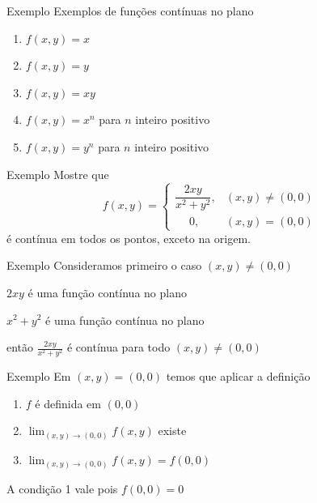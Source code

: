 \addtocounter{exemplo}{1}
\begin{frame}{Exemplo \theexemplo}
  Exemplos de funções contínuas no plano
  \begin{enumerate}[<+->]
    \item \(f(x, y) = x\)
    \item \(f(x, y) = y\)
    \item \(f(x, y) = xy\)
    \item \(f(x, y) = x^n\) para $n$ inteiro positivo
    \item \(f(x, y) = y^n\) para $n$ inteiro positivo
  \end{enumerate}
\end{frame}

\addtocounter{exemplo}{1}
\begin{frame}{Exemplo \theexemplo}
  Mostre que
  \[
    f(x, y) =
    \begin{cases}
      \dfrac{2xy}{x^2+y^2}, & (x, y) \neq (0, 0) \\
      \quad\; 0,            & (x, y) =    (0, 0)
    \end{cases}
  \]
  é contínua em todos os pontos, exceto na origem.
\end{frame}

\begin{frame}{Exemplo \theexemplo}
  Consideramos primeiro o caso \((x, y) \neq (0, 0)\)

  \pause
  \vspace{\baselineskip}
  \(2xy\) é uma função contínua no plano

  \pause
  \(x^2+y^2\) é uma função contínua no plano

  \pause
  então \(\frac{2xy}{x^2+y^2}\)
  \pause
  é contínua para todo \((x, y) \neq (0, 0)\)
\end{frame}

\begin{frame}{Exemplo \theexemplo}
  Em \((x, y) = (0, 0)\) temos que aplicar a definição
  \pause
  \begin{enumerate}
    \item \(f\) é definida em \((0, 0)\)
    \item \(\lim_{(x, y)\to(0, 0)} f(x, y)\) existe
    \item \(\lim_{(x, y)\to(0, 0)} f(x, y) = f(0, 0)\)
  \end{enumerate}

  \pause
  \vspace{\baselineskip}
  A condição 1 vale pois \(f(0, 0) = 0\)
\end{frame}

